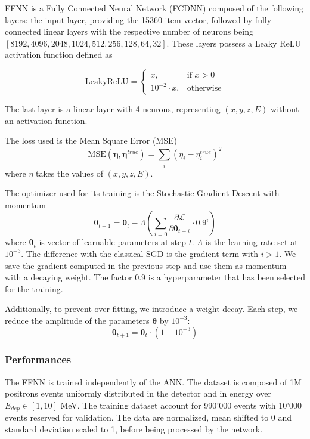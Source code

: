 \documentclass[../main.tex]{subfiles}
\begin{document}
FFNN is a Fully Connected Neural Network (FCDNN) composed of the following layers: the input layer, providing the 15360-item vector, followed by fully connected linear layers with the respective number of neurons being $[8192,4096,2048,1024,512,256,128,64,32]$. These layers possess a Leaky ReLU activation function defined as

\begin{equation}
  \mathrm{LeakyReLU} = \begin{cases}
    x, & \text{if } x > 0 \\
    10^{-2} \cdot x, & \text{otherwise}
  \end{cases}
\end{equation}

The last layer is a linear layer with 4 neurons, representing $(x,y,z,E)$ without an activation function.


The loss used is the Mean Square Error (MSE)
\begin{equation}
  \text{MSE}(\bm{\eta}, \bm{\eta}^{true}) = \sum_i (\eta_i - \eta_i^{true})^2
\end{equation}
where $\eta$ takes the values of $(x, y, z, E)$.

The optimizer used for its training is the Stochastic Gradient Descent with momentum
\begin{equation}
  \bm{\theta}_{t+1} = \bm{\theta}_t - \Lambda \left(\sum_{i=0} \frac{\partial \mathcal{L}}{\partial \bm{\theta}_{t - i}} \cdot 0.9^{i} \right)
\end{equation}
where $\bm{\theta}_t$ is vector of learnable parameters at step $t$. $\Lambda$ is the learning rate set at  $10^{-3}$. The difference with the classical SGD is the gradient term with $i > 1$. We save the gradient computed in the previous step and use them as momentum with a decaying weight. The factor 0.9 is a hyperparameter that has been selected for the training.

Additionally, to prevent over-fitting, we introduce a weight decay. Each step, we reduce the amplitude of the parameters $\bm{\theta}$ by $10^{-3}$:
\begin{equation}
  \bm{\theta}_{t+1} = \bm{\theta}_t \cdot (1 - 10^{-3})
\end{equation}

\subsubsection{Performances}

The FFNN is trained independently of the ANN. The dataset is composed of 1M positrons events uniformly distributed in the detector and in energy over $E_{dep} \in [1, 10]$ MeV. The training dataset account for 990'000 events with 10'000 events reserved for validation. The data are normalized, mean shifted to 0 and standard deviation scaled to 1, before being processed by the network.
\end{document}
